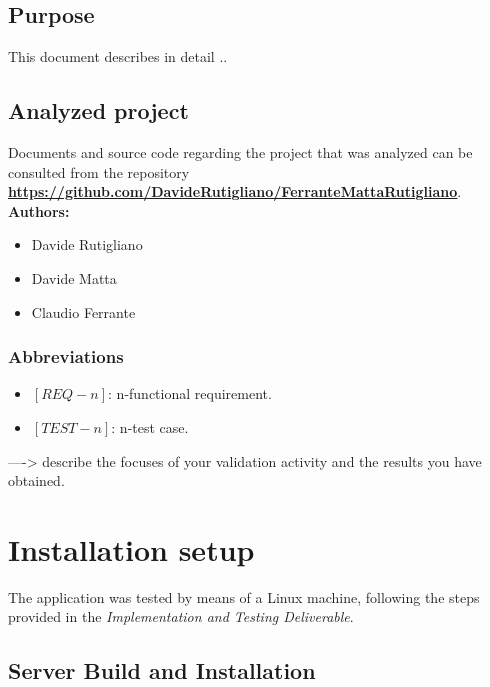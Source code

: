 \documentclass[a4paper, hidelinks, 12pt]{report}
\begin{document}
	\section{Purpose}
	This document describes in detail .. \\ 
	
	\section{Analyzed project}
	Documents and source code regarding the project that was analyzed can be consulted from the repository 
		\href{https://github.com/DavideRutigliano/FerranteMattaRutigliano}{\textbf{https://github.com/DavideRutigliano/FerranteMattaRutigliano}}.\\
		
	\textbf{Authors: } 
	\begin{itemize}
		\item Davide Rutigliano
		\item Davide Matta
		\item Claudio Ferrante
	\end{itemize}
	
	\subsection{Abbreviations}
	\begin{itemize}
		\item $[REQ-n]$: n-functional requirement.
		\item $[TEST-n]$: n-test case.
	\end{itemize}

 ----> describe the focuses of your validation
activity and the results you have obtained.

	\chapter{Installation setup}

	The application was tested by means of a Linux machine, following the steps provided in the \textit{Implementation and Testing Deliverable}. 
	
	\section{Server Build and Installation}
	
\end{document}
